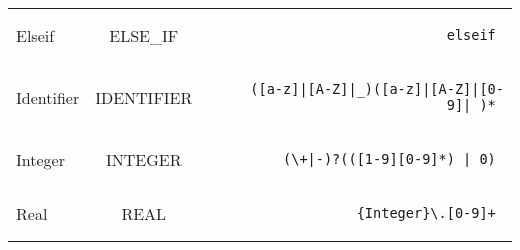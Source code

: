 \documentclass[a4paper,10pt]{article}
\begin{document}
\begin{tabular}{|l|c|r|}
Elseif & ELSE\_IF & \begin{minipage}{2in} \begin{verbatim} elseif \end{verbatim} \end{minipage} \\
Identifier & IDENTIFIER & \begin{minipage}{2in} \begin{verbatim} ([a-z]|[A-Z]|_)([a-z]|[A-Z]|[0-9]|_)* \end{verbatim} \end{minipage} \\
Integer & INTEGER & \begin{minipage}{2in} \begin{verbatim} (\+|-)?(([1-9][0-9]*) | 0) \end{verbatim} \end{minipage} \\
Real & REAL & \begin{minipage}{2in} \begin{verbatim} {Integer}\.[0-9]+ \end{verbatim} \end{minipage} \\
  \hline
\end{tabular}
\end{document}
